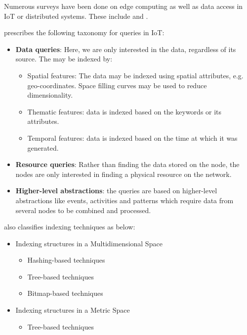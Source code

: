Numerous surveys have been done on edge computing as well as data access in IoT
or distributed systems. These include \citet{kouahlaSurveyBigIoT2022} and
\citet{fathyLargeScaleIndexingDiscovery2018}.

\citet{fathyLargeScaleIndexingDiscovery2018} prescribes the following taxonomy
for queries in IoT:

\begin{itemize}
      \item \textbf{Data queries}: Here, we are only interested in the data,
            regardless of its source. The may be indexed by:
            \begin{itemize}
                  \item Spatial features: The data may be indexed using spatial
                        attributes, e.g. geo-coordinates. Space filling curves
                        may be used to reduce dimensionality.
                  \item Thematic features: data is indexed based on the keywords
                        or its attributes.
                  \item Temporal features: data is indexed based on the time at
                        which it was generated.
            \end{itemize}

      \item \textbf{Resource queries}: Rather than finding the data stored on
            the node, the nodes are only interested in finding a physical
            resource on the network.
      \item \textbf{Higher-level abstractions}: the queries are based on
            higher-level abstractions like events, activities and patterns which
            require data from several nodes to be combined and processed.
\end{itemize}

\citet{kouahlaSurveyBigIoT2022} also classifies indexing techniques as below:

\begin{itemize}
      \item Indexing structures in a Multidimensional Space
            \begin{itemize}
                  \item Hashing-based techniques
                  \item Tree-based techniques
                  \item Bitmap-based techniques
            \end{itemize}
      \item Indexing structures in a Metric Space
            \begin{itemize}
                  \item Tree-based techniques
            \end{itemize}
\end{itemize}

